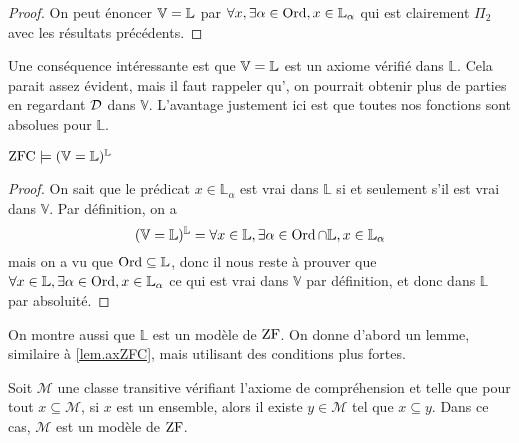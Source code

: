 \begin{proof}
  On peut énoncer $\mathbb V = \mathbb L$ par
  $\forall x, \exists \alpha \in \operatorname{Ord}, x\in \mathbb L_\alpha$ qui est clairement
  $\Pi_2$ avec les résultats précédents.
\end{proof}

Une conséquence intéressante est que $\mathbb V = \mathbb L$ est un axiome vérifié dans
$\mathbb L$. Cela parait assez évident, mais il faut rappeler
qu', on pourrait obtenir plus de parties en regardant
$\mathcal{D}$ dans $\mathbb V$. L'avantage justement ici est que toutes nos
fonctions sont absolues pour $\mathbb L$. 

\begin{theorem}
  $\operatorname{ZFC}\models (\mathbb V = \mathbb L)^{\mathbb L}$
\end{theorem}

\begin{proof}
  On sait que le prédicat $x\in \mathbb L_{\alpha}$ est vrai dans
  $\mathbb L$ si et seulement s'il est vrai dans $\mathbb V$. Par définition,
  on a
  \[(\mathbb V = \mathbb L)^{\mathbb L} =
  \forall x \in \mathbb L,\exists \alpha \in \operatorname{Ord}\cap \mathbb L,
  x\in \mathbb L_\alpha\]
  mais on a vu que $\operatorname{Ord}\subseteq \mathbb L$, donc il nous reste à prouver que
  $\forall x \in \mathbb L, \exists \alpha \in \operatorname{Ord}, x \in \mathbb L_\alpha$
  ce qui est vrai dans $\mathbb V$ par définition, et donc dans
  $\mathbb L$ par absoluité.
\end{proof}

On montre aussi que $\mathbb L$ est un modèle de $\operatorname{ZF}$. On donne d'abord un
lemme, similaire à \cref{lem.axZFC}, mais utilisant des conditions plus fortes.

\begin{lemma}\label{lem.axZFC2}
  Soit $\mathcal M$ une classe transitive vérifiant l'axiome de compréhension
  et telle que pour tout $x \subseteq \mathcal M$, si $x$ est un ensemble, alors
  il existe $y \in \mathcal M$ tel que $x \subseteq y$. Dans ce cas,
  $\mathcal M$ est un modèle de $\operatorname{ZF}$.
\end{lemma}

